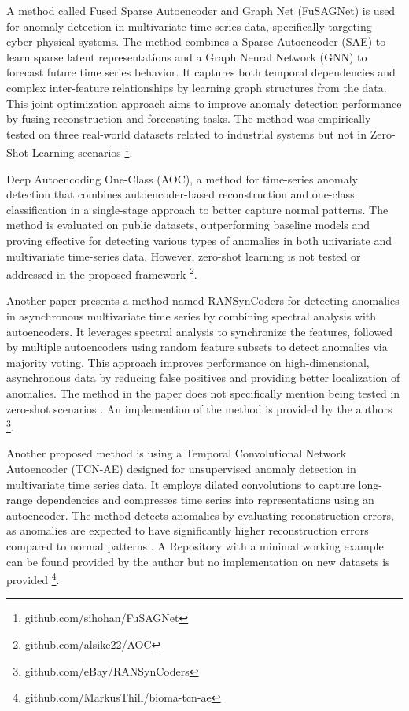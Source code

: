 A method called Fused Sparse Autoencoder and Graph Net (FuSAGNet) is used for anomaly detection in multivariate time series data, specifically targeting cyber-physical systems. The method combines a Sparse Autoencoder (SAE) to learn sparse latent representations and a Graph Neural Network (GNN) to forecast future time series behavior. It captures both temporal dependencies and complex inter-feature relationships by learning graph structures from the data. This joint optimization approach aims to improve anomaly detection performance by fusing reconstruction and forecasting tasks. The method was empirically tested on three real-world datasets related to industrial systems but not in Zero-Shot Learning scenarios \cite{han_learning_2022} \footnote{\fussy\tiny github.com/sihohan/FuSAGNet}.

Deep Autoencoding One-Class (AOC), a method for time-series anomaly detection that combines autoencoder-based reconstruction and one-class classification in a single-stage approach to better capture normal patterns. The method is evaluated on public datasets, outperforming baseline models and proving effective for detecting various types of anomalies in both univariate and multivariate time-series data. However, zero-shot learning is not tested or addressed in the proposed framework \cite{mou_deep_2023} \footnote{\fussy\tiny github.com/alsike22/AOC}.

Another paper presents a method named RANSynCoders for detecting anomalies in asynchronous multivariate time series by combining spectral analysis with autoencoders. It leverages spectral analysis to synchronize the features, followed by multiple autoencoders using random feature subsets to detect anomalies via majority voting. This approach improves performance on high-dimensional, asynchronous data by reducing false positives and providing better localization of anomalies. The method in the paper does not specifically mention being tested in zero-shot scenarios \cite{abdulaal_practical_2021}. An implemention of the method is provided by the authors \footnote{\fussy\tiny github.com/eBay/RANSynCoders}.

Another proposed method is using a Temporal Convolutional Network Autoencoder (TCN-AE) designed for unsupervised anomaly detection in multivariate time series data. It employs dilated convolutions to capture long-range dependencies and compresses time series into representations using an autoencoder. The method detects anomalies by evaluating reconstruction errors, as anomalies are expected to have significantly higher reconstruction errors compared to normal patterns \cite{thill_temporal_2021}. A Repository with a minimal working example can be found provided by the author but no implementation on new datasets is provided \footnote{\fussy\tiny github.com/MarkusThill/bioma-tcn-ae}.



